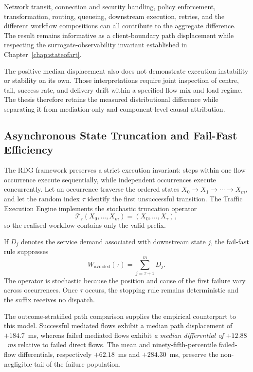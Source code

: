 \noindent Network transit, connection and security handling, policy enforcement,
transformation, routing, queueing, downstream execution, retries, and the
different workflow compositions can all contribute to the aggregate
difference. The result remains informative as a client-boundary path
displacement while respecting the surrogate-observability invariant established
in Chapter~\ref{chap:stateofart}.

\noindent The positive median displacement also does not demonstrate execution
instability or stability on its own. Those interpretations require joint
inspection of centre, tail, success rate, and delivery drift within a specified
flow mix and load regime. The thesis therefore retains the measured
distributional difference while separating it from mediation-only and
component-level causal attribution.

\subsection{Asynchronous State Truncation and Fail-Fast Efficiency}
\label{subsec:conclusions-state-truncation}

\noindent The RDG framework preserves a strict execution invariant: steps within one flow
occurrence execute sequentially, while independent occurrences execute
concurrently. Let an occurrence traverse the ordered states
$X_0\rightarrow X_1\rightarrow\cdots\rightarrow X_m$, and let the random
index $\tau$ identify the first unsuccessful transition. The Traffic Execution Engine
implements the stochastic truncation operator
\begin{equation}
    \mathcal{T}_{\tau}(X_0,\ldots,X_m)
      =(X_0,\ldots,X_{\tau}),
\end{equation}
so the realised workflow contains only the valid prefix.

\noindent If $D_j$ denotes the service demand associated with downstream state $j$,
the fail-fast rule suppresses
\begin{equation}
    W_{\mathrm{avoided}}(\tau)
       =\sum_{j=\tau+1}^{m}D_j.
\end{equation}
The operator is stochastic because the position and cause of the first failure
vary across occurrences. Once $\tau$ occurs, the stopping rule remains
deterministic and the suffix receives no dispatch.

\noindent The outcome-stratified path comparison supplies the empirical counterpart to
this model. Successful mediated flows exhibit a median path displacement of
$+184.7$~ms, whereas failed mediated flows exhibit
\emph{a median differential of $+12.88$~ms} relative to failed direct flows.
The mean and ninety-fifth-percentile failed-flow differentials, respectively
$+62.18$~ms and $+284.30$~ms, preserve the non-negligible tail of the failure
population.

